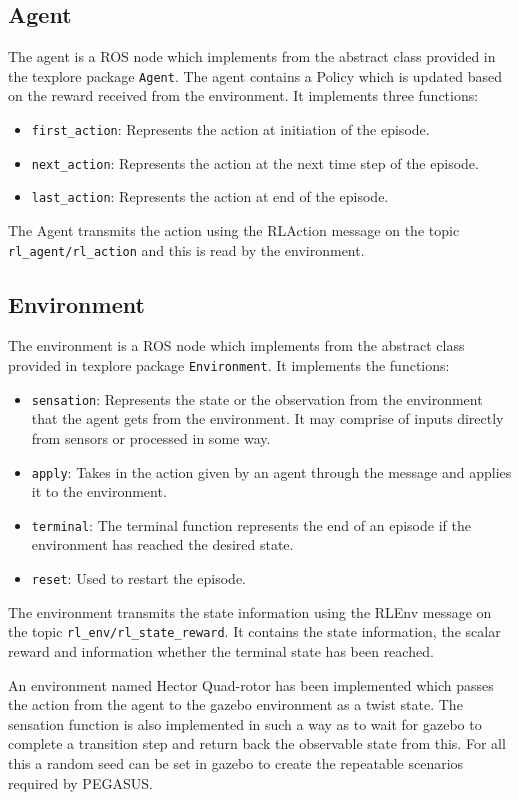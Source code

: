 \documentclass[hidelinks,BTech]{iitmdiss}
\begin{document}
\subsection*{Agent}
The agent is a ROS node which implements from the abstract class provided in the texplore package \texttt{Agent}. The agent contains a Policy which is updated based on the reward received from the environment. It implements three functions:
\begin{itemize}
	\item \texttt{first\_action}: Represents the action at initiation of the episode.
	\item \texttt{next\_action}: Represents the action at the next time step of the episode.
	\item \texttt{last\_action}: Represents the action at end of the episode. 
\end{itemize} 
The Agent transmits the action using the RLAction message on the topic \texttt{rl\_agent/rl\_action} and this is read by the environment.

\subsection*{Environment}
The environment is a ROS node which implements from the abstract class provided in texplore package \texttt{Environment}. It implements the functions:
\begin{itemize}
	\item \texttt{sensation}: Represents the state or the observation from the environment that the agent gets from the environment. It may comprise of inputs directly from sensors or processed in some way.
	\item \texttt{apply}:  Takes in the action given by an agent through the message and applies it to the environment. 
	\item \texttt{terminal}: The terminal function represents the end of an episode if the environment has reached the desired state. 
	\item  \texttt{reset}: Used to restart the episode. 
\end{itemize} 

The environment transmits the state information using the RLEnv message on the topic \texttt{rl\_env/rl\_state\_reward}. It contains the state information, the scalar reward and information whether the terminal state has been reached.

An environment named Hector Quad-rotor has been implemented which passes the action from the agent to the gazebo environment as a twist state. The sensation function is also implemented in such a way as to wait for gazebo to complete a transition step and return back the observable state from this. For all this a random seed can be set in gazebo to create the repeatable scenarios required by PEGASUS.
\end{document}
